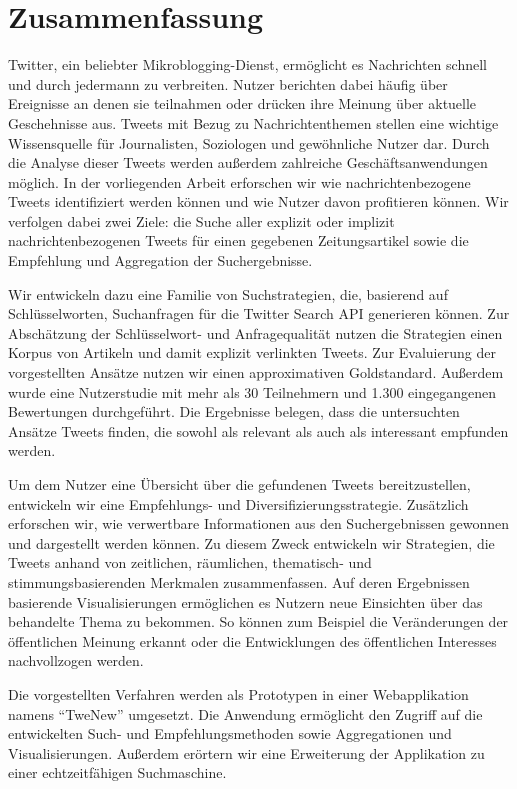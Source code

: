 \chapter*{Zusammenfassung}
\@openrighttrue\makeatother
Twitter, ein beliebter Mikroblogging-Dienst, erm\"oglicht es Nachrichten schnell und durch jedermann zu verbreiten. Nutzer berichten dabei h\"aufig \"uber Ereignisse an denen sie teilnahmen oder dr\"ucken ihre Meinung \"uber aktuelle Geschehnisse aus. Tweets mit Bezug zu Nachrichtenthemen stellen eine wichtige Wissensquelle f\"ur Journalisten, Soziologen und gew\"ohnliche Nutzer dar. Durch die Analyse dieser Tweets werden au\ss{}erdem zahlreiche Gesch\"aftsanwendungen m\"oglich. In der vorliegenden Arbeit erforschen wir wie nachrichtenbezogene Tweets identifiziert werden k\"onnen und wie Nutzer davon profitieren k\"onnen. Wir verfolgen dabei zwei Ziele: die Suche aller explizit oder implizit nachrichtenbezogenen Tweets f\"ur einen gegebenen Zeitungsartikel sowie die Empfehlung und Aggregation der Suchergebnisse.

Wir entwickeln dazu eine Familie von Suchstrategien, die, basierend auf Schl\"ussel\-worten, Suchanfragen f\"ur die Twitter Search API generieren k\"onnen. Zur Absch\"atzung der Schl\"usselwort- und Anfragequalit\"at nutzen die Strategien einen Korpus von Artikeln und damit explizit verlinkten Tweets. Zur Evaluierung der vorgestellten Ans\"atze nutzen wir einen approximativen Goldstandard. Au\ss{}erdem wurde eine Nutzerstudie mit mehr als 30 Teilnehmern und 1.300 eingegangenen Bewertungen durchgef\"uhrt. Die Ergebnisse belegen, dass die untersuchten Ans\"atze Tweets finden, die sowohl als relevant als auch als  interessant empfunden werden.

Um dem Nutzer eine \"Ubersicht \"uber die gefundenen Tweets bereitzustellen, entwickeln wir eine Empfehlungs- und Diversifizierungsstrategie. Zus\"atzlich erforschen wir, wie verwertbare Informationen aus den Suchergebnissen gewonnen und  dargestellt werden k\"onnen. Zu diesem Zweck entwickeln wir Strategien, die Tweets anhand von zeitlichen, r\"aumlichen, thematisch- und stimmungsbasierenden Merkmalen zusammenfassen. Auf deren Ergebnissen basierende Visualisierungen erm\"oglichen es Nutzern neue Einsichten \"uber das behandelte Thema zu bekommen. So k\"onnen zum Beispiel die Ver\"anderungen der \"offentlichen Meinung erkannt oder die Entwicklungen des \"offentlichen Interesses nachvollzogen werden.

Die vorgestellten Verfahren werden als Prototypen in einer Webapplikation namens ``TweNew'' umgesetzt. Die Anwendung erm\"oglicht den Zugriff auf die entwickelten Such- und Empfehlungsmethoden sowie Aggregationen und Visualisierungen. Au\ss{}erdem er\"ortern wir eine Erweiterung der Applikation zu einer echtzeitf\"ahigen Suchmaschine.